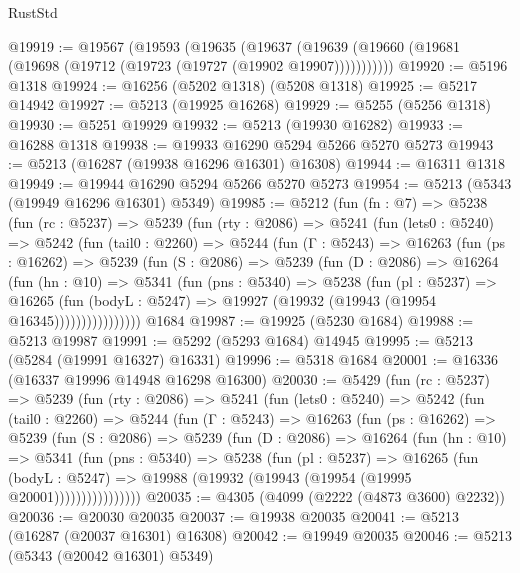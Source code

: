\begin{lexlean}{RustStd}
\begin{coremodule}
@19919 := @19567
    (@19593
      (@19635
        (@19637 (@19639 (@19660 (@19681 (@19698 (@19712 (@19723 (@19727 (@19902 @19907)))))))))))
@19920 := @5196 @1318
@19924 := @16256 (@5202 @1318) (@5208 @1318)
@19925 := @5217 @14942
@19927 := @5213 (@19925 @16268)
@19929 := @5255 (@5256 @1318)
@19930 := @5251 @19929
@19932 := @5213 (@19930 @16282)
@19933 := @16288 @1318
@19938 := @19933 @16290 @5294 @5266 @5270 @5273
@19943 := @5213 (@16287 (@19938 @16296 @16301) @16308)
@19944 := @16311 @1318
@19949 := @19944 @16290 @5294 @5266 @5270 @5273
@19954 := @5213 (@5343 (@19949 @16296 @16301) @5349)
@19985 := @5212
    (fun (fn : @7) =>
    @5238
      (fun (rc : @5237) =>
      @5239
        (fun (rty : @2086) =>
        @5241
          (fun (lets0 : @5240) =>
          @5242
            (fun (tail0 : @2260) =>
            @5244
              (fun (Γ : @5243) =>
              @16263
                (fun (ps : @16262) =>
                @5239
                  (fun (S : @2086) =>
                  @5239
                    (fun (D : @2086) =>
                    @16264
                      (fun (hn : @10) =>
                      @5341
                        (fun (pns : @5340) =>
                        @5238
                          (fun (pl : @5237) =>
                          @16265
                            (fun (bodyL : @5247) =>
                            @19927 (@19932 (@19943 (@19954 @16345))))))))))))))))
    @1684
@19987 := @19925 (@5230 @1684)
@19988 := @5213 @19987
@19991 := @5292 (@5293 @1684) @14945
@19995 := @5213 (@5284 (@19991 @16327) @16331)
@19996 := @5318 @1684
@20001 := @16336 (@16337 @19996 @14948 @16298 @16300)
@20030 := @5429
    (fun (rc : @5237) =>
    @5239
      (fun (rty : @2086) =>
      @5241
        (fun (lets0 : @5240) =>
        @5242
          (fun (tail0 : @2260) =>
          @5244
            (fun (Γ : @5243) =>
            @16263
              (fun (ps : @16262) =>
              @5239
                (fun (S : @2086) =>
                @5239
                  (fun (D : @2086) =>
                  @16264
                    (fun (hn : @10) =>
                    @5341
                      (fun (pns : @5340) =>
                      @5238
                        (fun (pl : @5237) =>
                        @16265
                          (fun (bodyL : @5247) =>
                          @19988 (@19932 (@19943 (@19954 (@19995 @20001))))))))))))))))
@20035 := @4305 (@4099 (@2222 (@4873 @3600) @2232))
@20036 := @20030 @20035
@20037 := @19938 @20035
@20041 := @5213 (@16287 (@20037 @16301) @16308)
@20042 := @19949 @20035
@20046 := @5213 (@5343 (@20042 @16301) @5349)

\end{coremodule}
\end{lexlean}
